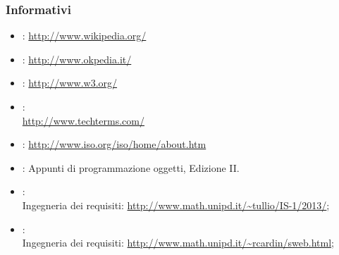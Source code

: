 \subsubsection{Informativi} %
\label{1.4.2}
\begin{itemize}
\item {}: \url{ http://www.wikipedia.org/}
\item {}: \url{ http://www.okpedia.it/}
\item {}: \url{http://www.w3.org/}
\item {}:\\ \url{http://www.techterms.com/}
\item {}: \url{http://www.iso.org/iso/home/about.htm}
\item {}: Appunti di programmazione oggetti, Edizione II.\\
\item {}:\\
Ingegneria dei requisiti: \url{http://www.math.unipd.it/~tullio/IS-1/2013/};
\item {}:\\
Ingegneria dei requisiti: \url{http://www.math.unipd.it/~rcardin/sweb.html};
\end{itemize}








